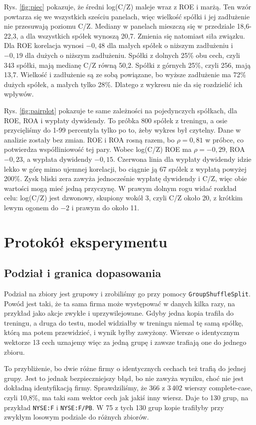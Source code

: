﻿\documentclass[10pt,twocolumn,a4paper]{article}
\begin{document}
Rys. \ref{fig:piec} pokazuje, że średni log(C/Z) maleje wraz z ROE i marżą. Ten wzór powtarza się we wszystkich sześciu panelach, więc wielkość spółki i jej zadłużenie nie przesuwają poziomu C/Z. Mediany w panelach mieszczą się w przedziale 18,6-22,3, a dla wszystkich spółek wynoszą 20,7. Zmienia się natomiast siła związku. Dla ROE korelacja wynosi $-0{,}48$ dla małych spółek o niższym zadłużeniu i $-0{,}19$ dla dużych o niższym zadłużeniu. Spółki z dolnych 25\% obu cech, czyli 343 spółki, mają medianę C/Z równą 50,2. Spółki z górnych 25\%, czyli 256, mają 13,7. Wielkość i zadłużenie są ze sobą powiązane, bo wyższe zadłużenie ma 72\% dużych spółek, a małych tylko 28\%. Dlatego z wykresu nie da się rozdzielić ich wpływów.

Rys. \ref{fig:pairplot} pokazuje te same zależności na pojedynczych spółkach, dla ROE, ROA i wypłaty dywidendy. To próbka 800 spółek z treningu, a osie przycięliśmy do 1-99 percentyla tylko po to, żeby wykres był czytelny. Dane w analizie zostały bez zmian. ROE i ROA rosną razem, bo $\rho = 0{,}81$ w próbce, co potwierdza współliniowość tej pary. Wobec log(C/Z) ROE ma $\rho = -0{,}29$, ROA $-0{,}23$, a wypłata dywidendy $-0{,}15$. Czerwona linia dla wypłaty dywidendy idzie lekko w górę mimo ujemnej korelacji, bo ciągnie ją 67 spółek z wypłatą powyżej 200\%. Zysk bliski zera zawyża jednocześnie wypłatę dywidendy i C/Z, więc obie wartości mogą mieć jedną przyczynę. W prawym dolnym rogu widać rozkład celu: log(C/Z) jest dzwonowy, skupiony wokół 3, czyli C/Z około 20, z krótkim lewym ogonem do $-2$ i prawym do około 11.



\section{Protokół eksperymentu}
\subsection{Podział i granica dopasowania}
Podział na zbiory jest grupowy i zrobiliśmy go przy pomocy \texttt{GroupShuffleSplit}. Powód jest taki, że ta sama firma może występować w danych kilka razy, na przykład jako akcje zwykłe i uprzywilejowane. Gdyby jedna kopia trafiła do treningu, a druga do testu, model widziałby w treningu niemal tę samą spółkę, którą ma potem przewidzieć, i wynik byłby zawyżony. Wiersze o identycznym wektorze 13 cech uznajemy więc za jedną grupę i zawsze trafiają one do jednego zbioru.

To przybliżenie, bo dwie różne firmy o identycznych cechach też trafią do jednej grupy. Jest to jednak bezpieczniejszy błąd, bo nie zawyża wyniku, choć nie jest dokładną identyfikacją firmy. Sprawdziliśmy, że 366 z 3\,402 wierszy complete-case, czyli 10,8\%, ma taki sam wektor cech jak jakiś inny wiersz. Daje to 130 grup, na przykład \texttt{NYSE:F} i \texttt{NYSE:F/PB}. W 75 z tych 130 grup kopie trafiłyby przy zwykłym losowym podziale do różnych zbiorów.
\end{document}
